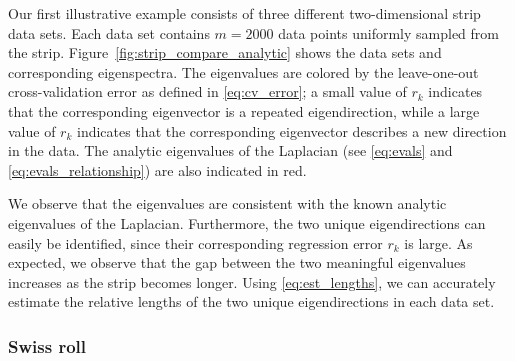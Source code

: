 \documentclass[preprint]{elsarticle}
\begin{document}
Our first illustrative example consists of three different two-dimensional strip data sets. 
%
Each data set contains $m=2000$ data points uniformly sampled from the strip. 
%
Figure~\ref{fig:strip_compare_analytic} shows the data sets and corresponding eigenspectra.
%
The eigenvalues are colored by the leave-one-out cross-validation error as defined in \eqref{eq:cv_error}; a small value of $r_k$ indicates that the corresponding eigenvector is a repeated eigendirection, while a large value of $r_k$ indicates that the corresponding eigenvector describes a new direction in the data. 
%
The analytic eigenvalues of the Laplacian (see \eqref{eq:evals} and \eqref{eq:evals_relationship}) are also indicated in red. 

We observe that the eigenvalues are consistent with the known analytic eigenvalues of the Laplacian.
%
Furthermore, the two unique eigendirections can easily be identified, since their corresponding regression error $r_k$ is large. 
%
As expected, we observe that the gap between the two meaningful eigenvalues increases as the strip becomes longer. 
%
Using \eqref{eq:est_lengths}, we can accurately estimate the relative lengths of the two unique eigendirections in each data set. 


\subsubsection{Swiss roll}
\end{document}
